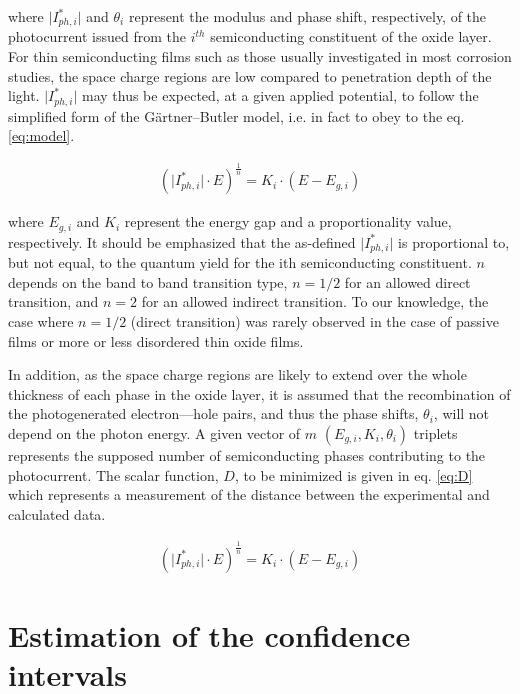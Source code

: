 \documentclass[10pt, 3p, sort&compress]{elsarticle}
\begin{document}
\noindent where $\vert I_{ph,i}^* \vert$ and $\theta _i$ represent the modulus and phase shift, respectively, of the photocurrent issued from the $i^{th}$ semiconducting constituent of the oxide layer. For thin semiconducting films such as those usually investigated in most corrosion studies, the space charge regions are low compared to penetration depth of the light.  $\vert I_{ph,i}^* \vert$ may thus be expected, at a given applied potential, to follow the simplified form of the Gärtner–Butler model, i.e. in fact to obey to the eq. \ref{eq:model}.

\begin{equation}
\begin{split}
\left( \vert I_{ph,i}^* \vert \cdot E \right)^{\frac{1}{n}} = K_i \cdot \left(  E - E_{g,i}  \right)
\end{split}
\label{eq:model}
\end{equation}

\noindent where $E_{g,i}$ and $K_i$ represent the energy gap and a proportionality value, respectively. It should be emphasized that the as-defined $\vert I_{ph,i}^* \vert$ is proportional to, but not equal, to the quantum yield for the ith semiconducting constituent. $n$ depends on the band to band transition type, $n = 1/2$ for an allowed direct transition, and $n = 2$ for an allowed indirect transition. To our knowledge, the case where $n = 1/2$ (direct transition) was rarely observed in the case of passive films or more or less disordered thin oxide films.

In addition, as the space charge regions are likely to extend over the whole thickness of each phase in the oxide layer, it is assumed that the recombination of the photogenerated electron---hole pairs, and thus the phase shifts, $\theta _i$, will not depend on the photon energy.
A given vector of $m$ $(E_{g,i}, K_i , \theta_i)$ triplets represents the supposed number of semiconducting phases contributing to the photocurrent. The scalar function, $D$, to be minimized is given in  eq. \ref{eq:D} which represents a measurement of the distance between the experimental and calculated data.

\begin{equation}
\begin{split}
\left( \vert I_{ph,i}^* \vert \cdot E \right)^{\frac{1}{n}} = K_i \cdot \left(  E - E_{g,i}  \right)
\end{split}
\label{eq:D}
\end{equation}

\section{Estimation of the confidence intervals}
\end{document}
